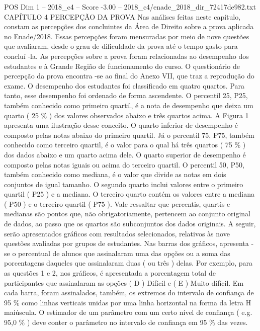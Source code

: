 \begin{textsample}{POS Dim 1 – 2018\_c4 – Score -3.00 – 2018\_c4/enade\_2018\_dir\_72417de982.txt}  \label{ex:f1_pos_302}
CAPÍTULO 4 PERCEPÇÃO DA PROVA Nas análises feitas neste capítulo, constam as percepções dos concluintes da Área de Direito sobre a prova aplicada no Enade/2018.
Essas percepções foram mensuradas por meio de nove questões que avaliaram, desde o grau de dificuldade da prova até o tempo gasto para concluí -la.
As percepções sobre a prova foram relacionadas ao desempenho dos estudantes e à Grande Região de funcionamento do curso.
O questionário de percepção da prova encontra -se ao final do Anexo VII, que traz a reprodução do exame.
O desempenho dos estudantes foi classificado em quatro quartos.
Para tanto, esse desempenho foi ordenado de forma ascendente.
O percentil 25, P25, também conhecido como primeiro quartil, é a nota de desempenho que deixa um quarto ( 25 \% ) dos valores observados abaixo e três quartos acima.
A Figura 1 apresenta uma ilustração desse conceito.
O quarto inferior de desempenho é composto pelas notas abaixo do primeiro quartil.
Já o percentil 75, P75, também conhecido como terceiro quartil, é o valor para o qual há três quartos ( 75 \% ) dos dados abaixo e um quarto acima dele.
O quarto superior de desempenho é composto pelas notas iguais ou acima do terceiro quartil.
O percentil 50, P50, também conhecido como mediana, é o valor que divide as notas em dois conjuntos de igual tamanho.
O segundo quarto inclui valores entre o primeiro quartil ( P25 ) e a mediana.
O terceiro quarto contém os valores entre a mediana ( P50 ) e o terceiro quartil ( P75 ).
Vale ressaltar que percentis, quartis e medianas são pontos que, não obrigatoriamente, pertencem ao conjunto original de dados, ao passo que os quartos são subconjuntos dos dados originais.
A seguir, serão apresentados gráficos com resultados selecionados, relativos às nove questões avaliadas por grupos de estudantes.
Nas barras dos gráficos, apresenta -se o percentual de alunos que assinalaram uma das opções ou a soma das porcentagens daqueles que assinalaram duas ( ou três ) delas.
Por exemplo, para as questões 1 e 2, nos gráficos, é apresentada a porcentagem total de participantes que assinalaram as opções ( D ) Difícil e ( E ) Muito difícil.
Em cada barra, foram assinalados, também, os extremos do intervalo de confiança de 95 \% como linhas verticais unidas por uma linha horizontal na forma da letra H maiúscula.
O estimador de um parâmetro com um certo nível de confiança ( e.g. 95,0 \% ) deve conter o parâmetro no intervalo de confiança em 95 \% das vezes.

\end{textsample}
